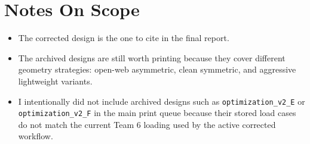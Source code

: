 \documentclass[11pt]{article}
\newcommand{\designid}[1]{\nolinkurl{#1}}
\begin{document}
\section*{Notes On Scope}

\begin{itemize}
  \item The corrected design is the one to cite in the final report.
  \item The archived designs are still worth printing because they cover
  different geometry strategies: open-web asymmetric, clean symmetric, and
  aggressive lightweight variants.
  \item I intentionally did not include archived designs such as
  \designid{optimization_v2_E} or \designid{optimization_v2_F} in the main
  print queue because their stored load cases do not match the current Team 6
  loading used by the active corrected workflow.
\end{itemize}
\end{document}
